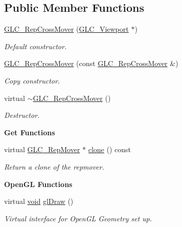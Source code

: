 \subsection*{Public Member Functions}
\begin{DoxyCompactItemize}
\item 
\hyperlink{class_g_l_c___rep_cross_mover_ab9e26e1a3fac419121f20304d2a6d39a}{G\-L\-C\-\_\-\-Rep\-Cross\-Mover} (\hyperlink{class_g_l_c___viewport}{G\-L\-C\-\_\-\-Viewport} $\ast$)
\begin{DoxyCompactList}\small\item\em Default constructor. \end{DoxyCompactList}\item 
\hyperlink{class_g_l_c___rep_cross_mover_a38e75ec281b3dbeb8ad3c612c429ce45}{G\-L\-C\-\_\-\-Rep\-Cross\-Mover} (const \hyperlink{class_g_l_c___rep_cross_mover}{G\-L\-C\-\_\-\-Rep\-Cross\-Mover} \&)
\begin{DoxyCompactList}\small\item\em Copy constructor. \end{DoxyCompactList}\item 
virtual \hyperlink{class_g_l_c___rep_cross_mover_a1bc91e32f346e7b022e61946a2f63b70}{$\sim$\-G\-L\-C\-\_\-\-Rep\-Cross\-Mover} ()
\begin{DoxyCompactList}\small\item\em Destructor. \end{DoxyCompactList}\end{DoxyCompactItemize}
\begin{Indent}{\bf Get Functions}\par
\begin{DoxyCompactItemize}
\item 
virtual \hyperlink{class_g_l_c___rep_mover}{G\-L\-C\-\_\-\-Rep\-Mover} $\ast$ \hyperlink{class_g_l_c___rep_cross_mover_a1b8baa5233e17ec72afa955610a0c059}{clone} () const 
\begin{DoxyCompactList}\small\item\em Return a clone of the repmover. \end{DoxyCompactList}\end{DoxyCompactItemize}
\end{Indent}
\begin{Indent}{\bf Open\-G\-L Functions}\par
\begin{DoxyCompactItemize}
\item 
virtual \hyperlink{group___u_a_v_objects_plugin_ga444cf2ff3f0ecbe028adce838d373f5c}{void} \hyperlink{class_g_l_c___rep_cross_mover_a6af319e4fcc050860515ba6c1baa8027}{gl\-Draw} ()
\begin{DoxyCompactList}\small\item\em Virtual interface for Open\-G\-L Geometry set up. \end{DoxyCompactList}\end{DoxyCompactItemize}
\end{Indent}

